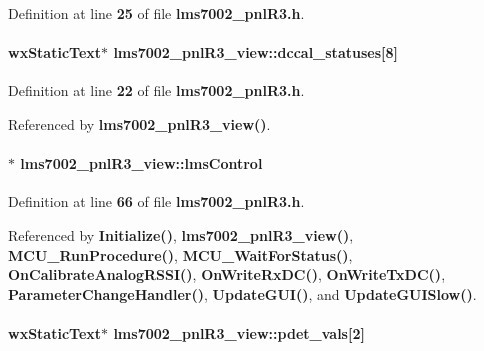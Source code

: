 Definition at line {\bf 25} of file {\bf lms7002\+\_\+pnl\+R3.\+h}.

\paragraph[{dccal\+\_\+statuses}]{\setlength{\rightskip}{0pt plus 5cm}wx\+Static\+Text$\ast$ lms7002\+\_\+pnl\+R3\+\_\+view\+::dccal\+\_\+statuses[8]\hspace{0.3cm}{\ttfamily [protected]}}\label{classlms7002__pnlR3__view_ab816631fd28396254273718681df5d38}


Definition at line {\bf 22} of file {\bf lms7002\+\_\+pnl\+R3.\+h}.



Referenced by {\bf lms7002\+\_\+pnl\+R3\+\_\+view()}.

\paragraph[{lms\+Control}]{$\ast$ lms7002\+\_\+pnl\+R3\+\_\+view\+::lms\+Control\hspace{0.3cm}{\ttfamily [protected]}}\label{classlms7002__pnlR3__view_a1cbdb5440e617050b4b12f6a7e9fafe6}


Definition at line {\bf 66} of file {\bf lms7002\+\_\+pnl\+R3.\+h}.



Referenced by {\bf Initialize()}, {\bf lms7002\+\_\+pnl\+R3\+\_\+view()}, {\bf M\+C\+U\+\_\+\+Run\+Procedure()}, {\bf M\+C\+U\+\_\+\+Wait\+For\+Status()}, {\bf On\+Calibrate\+Analog\+R\+S\+S\+I()}, {\bf On\+Write\+Rx\+D\+C()}, {\bf On\+Write\+Tx\+D\+C()}, {\bf Parameter\+Change\+Handler()}, {\bf Update\+G\+U\+I()}, and {\bf Update\+G\+U\+I\+Slow()}.

\paragraph[{pdet\+\_\+vals}]{\setlength{\rightskip}{0pt plus 5cm}wx\+Static\+Text$\ast$ lms7002\+\_\+pnl\+R3\+\_\+view\+::pdet\+\_\+vals[2]\hspace{0.3cm}{\ttfamily [protected]}}\label{classlms7002__pnlR3__view_afde8ceea20f35cf016a18542e66e8523}


